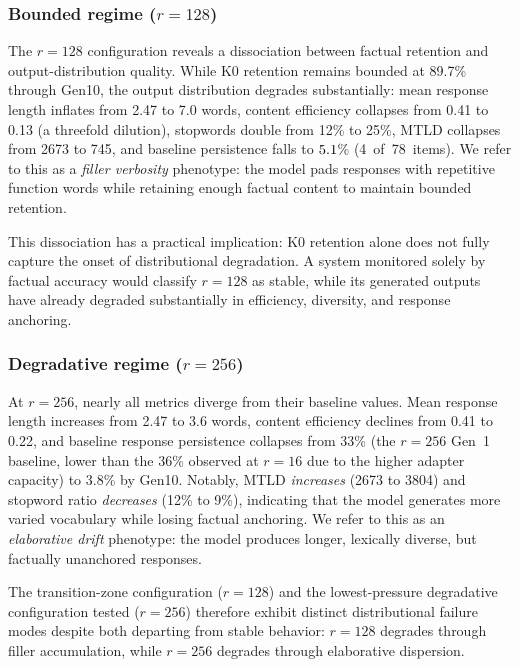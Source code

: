 \documentclass[a4paper,fleqn]{cas-dc}
\newif\ifshowchanges
\newcommand{\rev}[1]{\ifshowchanges{\color{blue}#1}\else{#1}\fi}
\begin{document}
\subsubsection{Bounded regime ($r=128$)}\label{sec:dissociation}
The $r=128$ configuration reveals a dissociation between factual retention and
output-distribution quality. While K0 retention remains bounded at 89.7\% through
Gen10, the output distribution degrades substantially: mean response length
inflates from 2.47 to 7.0 words, content efficiency collapses from 0.41 to 0.13
(a threefold dilution), stopwords double from 12\% to 25\%, MTLD collapses from
2673 to 745, and baseline persistence falls to \rev{$5.1$\% (4~of~78~items)}. We refer to this as a
\textit{filler verbosity} phenotype: the model pads responses with repetitive
function words while retaining enough factual content to maintain bounded
retention.

This dissociation has a practical implication: K0 retention alone does not fully
capture the onset of distributional degradation. A system monitored solely by
factual accuracy would classify $r=128$ as stable, while its generated outputs
have already degraded substantially in efficiency, diversity, and response
anchoring.

\subsubsection{Degradative regime ($r=256$)}
At $r=256$, nearly all metrics diverge from their baseline values. Mean response
length increases from 2.47 to 3.6 words, content efficiency declines from 0.41
to 0.22, and baseline response persistence collapses from \rev{33\% (the $r=256$ Gen~1 baseline, lower than the 36\% observed at $r=16$ due to the higher adapter capacity)} to 3.8\% by
Gen10. Notably, MTLD \textit{increases} (2673 to 3804) and stopword ratio
\textit{decreases} (12\% to 9\%), indicating that the model generates more
varied vocabulary while losing factual anchoring. We refer to this as an
\textit{elaborative drift} phenotype: the model produces longer, lexically
diverse, but factually unanchored responses.

\rev{The transition-zone configuration ($r=128$) and the lowest-pressure degradative configuration tested ($r=256$) therefore exhibit distinct distributional failure modes despite both departing from stable behavior: $r=128$ degrades through filler accumulation, while $r=256$ degrades through elaborative dispersion.}
\end{document}
